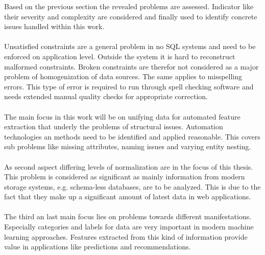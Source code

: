 Based on the previous section the revealed problems are assessed. Indicator like their severity and complexity are considered and finally used to identify concrete issues handled within this work. 
\\\\
Unsatisfied constraints are a general problem in no SQL systems and need to be enforced on application level. Outside the system it is hard to reconstruct malformed constraints. Broken constraints are therefor not considered as a major problem of homogenization of data sources. The same applies to misspelling errors. This type of error is required to run through spell checking software and needs extended manual quality checks for appropriate correction. 
\\\\
The main focus in this work will be on unifying data for automated feature extraction that underly the problems of structural issues. Automation technologies an methods need to be identified and applied reasonable. This covers sub problems like missing attributes, naming issues and varying entity nesting.
\\\\
As second aspect differing levels of normalization are in the focus of this thesis. This problem is considered as significant as mainly information from modern storage systems, e.g. schema-less databases, are to be analyzed. This is due to the fact that they make up a significant amount of latest data in web applications.
\\\\
The third an last main focus lies on problems towards different manifestations. Especially categories and labels for data are very important in modern machine learning approaches. Features extracted from this kind of information provide value in applications like predictions and recommendations.